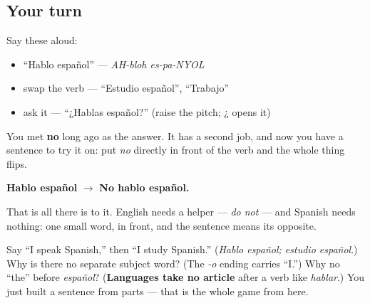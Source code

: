 \subsection*{Your turn}
Say these aloud:

\begin{itemize}
\raggedright
  \item \textquotedblleft{}Hablo español\textquotedblright{} — \emph{AH-bloh es-pa-NYOL}
  \item swap the verb — \textquotedblleft{}Estudio español\textquotedblright{}, \textquotedblleft{}Trabajo\textquotedblright{}
  \item ask it — \textquotedblleft{}¿Hablas español?\textquotedblright{} (raise the pitch; ¿ opens it)
\end{itemize}

\begin{culture}
You met \textbf{no} long ago as the answer. It has a second job, and now you have a sentence to try it on: put \emph{no} directly in front of the verb and the whole thing flips.

\textbf{Hablo español} $\to$ \textbf{No hablo español.}

That is all there is to it. English needs a helper — \emph{do not} — and Spanish needs nothing: one small word, in front, and the sentence means its opposite.
\end{culture}

\begin{tcolorbox}[breakable,colback=teal!4,colframe=teal!35!black,title={Before you move on}]
Say \textquotedblleft{}I speak Spanish,\textquotedblright{} then \textquotedblleft{}I study Spanish.\textquotedblright{} (\emph{Hablo español; estudio español}.) Why is there no separate subject word? (The \emph{-o} ending carries \textquotedblleft{}I.\textquotedblright{}) Why no \textquotedblleft{}the\textquotedblright{} before \emph{español}? (\textbf{Languages take no article} after a verb like \emph{hablar}.) You just built a sentence from parts — that is the whole game from here.
\end{tcolorbox}
